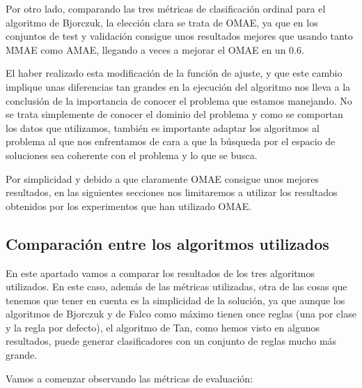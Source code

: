 Por otro lado, comparando las tres métricas de clasificación ordinal para el algoritmo de Bjorczuk, la elección clara se trata de OMAE, ya que en los conjuntos de test y validación consigue unos resultados mejores que usando tanto MMAE como AMAE, llegando a veces a mejorar el OMAE en un $0.6$.

El haber realizado esta modificación de la función de ajuste, y que este cambio implique unas diferencias tan grandes en la ejecución del algoritmo nos lleva a la conclusión de la importancia de conocer el problema que estamos manejando. No se trata simplemente de conocer el dominio del problema y como se comportan los datos que utilizamos, también es importante adaptar los algoritmos al problema al que nos enfrentamos de cara a que la búsqueda por el espacio de soluciones sea coherente con el problema y lo que se busca.

Por simplicidad y debido a que claramente OMAE consigue unos mejores resultados, en las siguientes secciones nos limitaremos a utilizar los resultados obtenidos por los experimentos que han utilizado OMAE.


\subsection{Comparación entre los algoritmos utilizados}

En este apartado vamos a comparar los resultados de los tres algoritmos utilizados. En este caso, además de las métricas utilizadas, otra de las cosas que tenemos que tener en cuenta es la simplicidad de la solución, ya que aunque los algoritmos de Bjorczuk y de Falco como máximo tienen once reglas (una por clase y la regla por defecto), el algoritmo de Tan, como hemos visto en algunos resultados, puede generar clasificadores con un conjunto de reglas mucho más grande.


Vamos a comenzar observando las métricas de evaluación:

